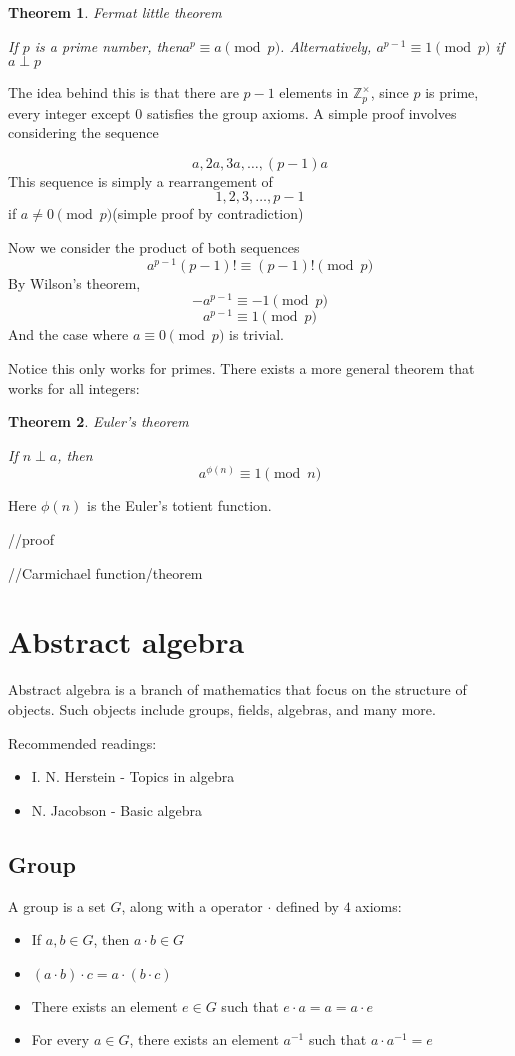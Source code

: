\documentclass{report}
\newtheorem{theorem}{Theorem}[section]
\begin{document}
\begin{theorem}
	Fermat little theorem
	
	If $p$ is a prime number, then$a^p\equiv a\pmod p$. Alternatively, $a^{p-1}\equiv1\pmod p$ if $a\perp p$
\end{theorem}
The idea behind this is that there are $p-1$ elements in $\mathbb{Z}_p^\times$, since $p$ is prime, every integer except $0$ satisfies the group axioms. A simple proof involves considering the sequence

$$a,2a,3a,\dots,(p-1)a$$
This sequence is simply a rearrangement of 
$$1,2,3,\dots,p-1$$
if $a\neq 0\pmod p$(simple proof by contradiction)

Now we consider the product of both sequences
$$a^{p-1}(p-1)!\equiv(p-1)!\pmod p$$
By Wilson's theorem,
$$-a^{p-1}\equiv-1\pmod p$$
$$a^{p-1}\equiv1\pmod p$$
And the case where $a\equiv0\pmod p$ is trivial.

Notice this only works for primes. There exists a more general theorem that works for all integers:
\begin{theorem}
	Euler's theorem
	
	If $n\perp a$, then $$a^{\phi(n)}\equiv1\pmod n$$
\end{theorem}
Here $\phi(n)$ is the Euler's totient function.

//proof	

//Carmichael function/theorem
\chapter{Abstract algebra}
Abstract algebra is a branch of mathematics that focus on the structure of objects. Such objects include groups, fields, algebras, and many more.

Recommended readings:

\begin{itemize}
	\item I. N. Herstein - Topics in algebra
	\item N. Jacobson - Basic algebra
\end{itemize}

\section{Group}

A group is a set $G$, along with a operator $\cdot$ defined by $4$ axioms:

\begin{itemize}
	\item If $a,b\in G$, then $a\cdot b\in G$
	\item $(a\cdot b)\cdot c=a\cdot(b\cdot c)$
	\item There exists an element $e\in G$ such that $e\cdot a=a=a\cdot e$
	\item For every $a\in G$, there exists an element $a^{-1}$ such that $a\cdot a^{-1}=e$
\end{itemize}
\end{document}
